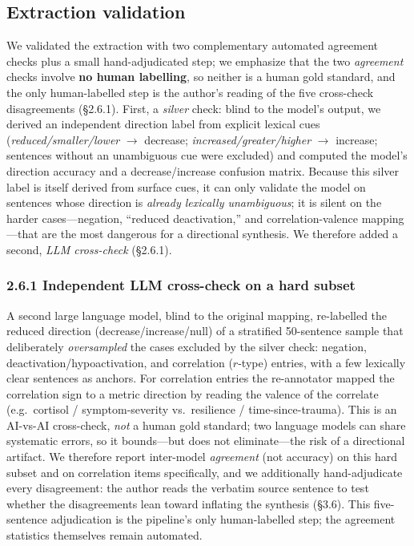\documentclass[11pt]{article}
\begin{document}
\subsection{Extraction validation}
We validated the extraction with two complementary automated agreement checks
plus a small hand-adjudicated step; we emphasize that the two \emph{agreement}
checks involve \textbf{no human labelling}, so neither is a human gold standard,
and the only human-labelled step is the author's reading of the five cross-check
disagreements (\S2.6.1). First, a \emph{silver} check: blind to the
model's output, we derived an independent direction label from explicit lexical
cues (\emph{reduced/smaller/lower} $\to$ decrease; \emph{increased/greater/higher}
$\to$ increase; sentences without an unambiguous cue were excluded) and computed
the model's direction accuracy and a decrease/increase confusion matrix. Because
this silver label is itself derived from surface cues, it can only validate the
model on sentences whose direction is \emph{already lexically unambiguous}; it is
silent on the harder cases---negation, ``reduced deactivation,'' and
correlation-valence mapping---that are the most dangerous for a directional
synthesis. We therefore added a second, \emph{LLM cross-check} (\S2.6.1).

\subsubsection*{2.6.1 Independent LLM cross-check on a hard subset}
A second large language model, blind to the original mapping, re-labelled the
reduced direction (decrease/increase/null) of a stratified 50-sentence sample
that deliberately \emph{oversampled} the cases excluded by the silver check:
negation, deactivation/hypoactivation, and correlation ($r$-type) entries, with a
few lexically clear sentences as anchors. For correlation entries the
re-annotator mapped the correlation sign to a metric direction by reading the
valence of the correlate (e.g.\ cortisol / symptom-severity vs.\ resilience /
time-since-trauma). This is an AI-vs-AI cross-check, \emph{not} a human gold
standard; two language models can share systematic errors, so it bounds---but
does not eliminate---the risk of a directional artifact. We therefore report
inter-model \emph{agreement} (not accuracy) on this hard subset and on
correlation items specifically, and we additionally hand-adjudicate every
disagreement: the author reads the verbatim source sentence to test whether the
disagreements lean toward inflating the synthesis (\S3.6). This five-sentence
adjudication is the pipeline's only human-labelled step; the agreement statistics
themselves remain automated.
\end{document}
